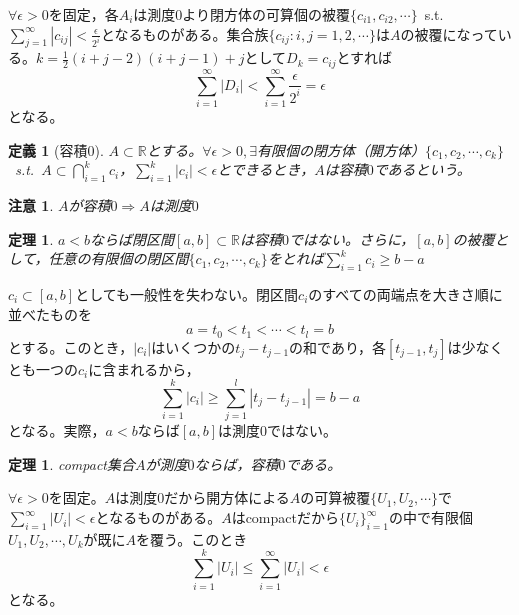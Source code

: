 \documentclass[dvipdfmx,a4j,10pt]{jsarticle}
\makeatletter
\theoremstyle{mystyle1}
\newtheorem{thm}[dfn]{定理}
\theoremstyle{mystyle2}
\newtheorem{dfn*}{定義}
\newtheorem{note}{注意}
\renewenvironment{proof}[1][\proofname]{\par
  \pushQED{\qed}%
  \normalfont
  \topsep6\p@\@plus6\p@ \trivlist
  \item[\hskip\labelsep{\bfseries\sffamily #1}]\ignorespaces
}{%
  \popQED\endtrivlist\@endpefalse
}
\renewcommand\proofname{証明}
\makeatother
\begin{document}
\begin{proof}
	$\forall\epsilon>0$を固定，各$A_i$は測度$0$より閉方体の可算個の被覆$\{c_{i1},c_{i2},\cdots\}$\ {\rm s.t.}\ $\displaystyle\sum_{j=1}^\infty|c_{ij}|<\frac{\epsilon}{2^i}$となるものがある。集合族$\{c_{ij}:i,j=1,2,\cdots\}$は$A$の被覆になっている。$\displaystyle k=\frac{1}{2}(i+j-2)(i+j-1)+j$として$D_k=c_{ij}$とすれば
	\[
		\sum_{i=1}^\infty|D_i|<\sum_{i=1}^\infty\frac{\epsilon}{2^i}=\epsilon
	\]
	となる。
\end{proof}

\begin{dfn*}[容積0]
	$A\subset\mathbb{R}$とする。$\forall\epsilon>0,\exists$有限個の閉方体（開方体）$\{c_1,c_2,\cdots,c_k\}$\ s.t.\ $A\displaystyle\subset\bigcap_{i=1}^kc_i$，$\displaystyle\sum_{i=1}^k|c_i|<\epsilon$とできるとき，$A$は容積$0$であるという。
\end{dfn*}

\begin{note}
	$A$が容積$0\Rightarrow A$は測度$0$
\end{note}

\begin{framed}
	\begin{thm}\label{th3.5}
		$a<b$ならば閉区間$[a,b]\subset\mathbb{R}$は容積$0$ではない。さらに，$[a,b]$の被覆として，任意の有限個の閉区間$\{c_1,c_2,\cdots,c_k\}$をとれば$\sum_{i=1}^k c_i\geq b-a$
	\end{thm}
\end{framed}

\begin{proof}
	$c_i\subset [a,b]$としても一般性を失わない。閉区間$c_i$のすべての両端点を大きさ順に並べたものを
	\[
		a=t_0<t_1<\cdots<t_l=b
	\]
	とする。このとき，$|c_i|$はいくつかの$t_j-t_{j-1}$の和であり，各$[t_{j-1},t_j]$は少なくとも一つの$c_i$に含まれるから，
	\[
		\sum_{i=1}^k|c_i|\geq \sum_{j=1}^l|t_j-t_{j-1}|=b-a
	\]
	となる。実際，$a<b$ならば$[a,b]$は測度$0$ではない。
\end{proof}

\begin{framed}
	\begin{thm}\label{th3.6}
		compact集合$A$が測度$0$ならば，容積$0$である。
	\end{thm}
\end{framed}

\begin{proof}
	$\forall\epsilon>0$を固定。$A$は測度$0$だから開方体による$A$の可算被覆$\{U_1,U_2,\cdots\}$で$\displaystyle\sum_{i=1}^\infty|U_i|<\epsilon$となるものがある。$A$はcompactだから$\{U_i\}_{i=1}^\infty$の中で有限個$U_1,U_2,\cdots,U_k$が既に$A$を覆う。このとき
	\[
		\sum_{i=1}^k|U_i|\leq\sum_{i=1}^\infty|U_i|<\epsilon
	\]
	となる。
\end{proof}
\end{document}
